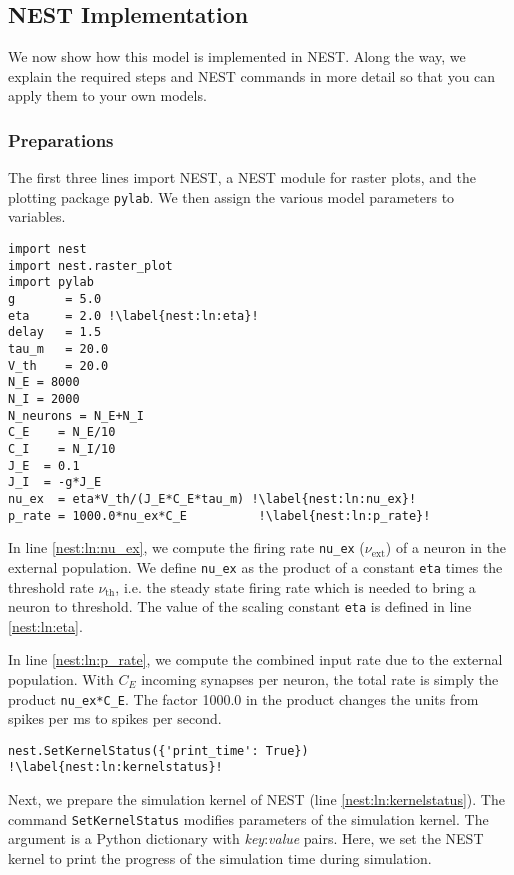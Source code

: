 \documentclass{article}
\begin{document}
\subsection{NEST Implementation}\label{nest:sec:brunel_impl}

We now show how this model is implemented in NEST. Along the way, we
explain the required steps and NEST commands in more detail so that
you can apply them to your own models.

\subsubsection{Preparations}
The first three lines import NEST, a NEST module for raster plots, and
the plotting package \lstinline!pylab!. We then assign the various model
parameters to variables.
\begin{lstlisting}[name=Brunel_interactive]
import nest
import nest.raster_plot
import pylab
g       = 5.0 
eta     = 2.0 !\label{nest:ln:eta}!
delay   = 1.5 
tau_m   = 20.0
V_th    = 20.0
N_E = 8000
N_I = 2000
N_neurons = N_E+N_I
C_E    = N_E/10
C_I    = N_I/10
J_E  = 0.1
J_I  = -g*J_E
nu_ex  = eta*V_th/(J_E*C_E*tau_m) !\label{nest:ln:nu_ex}!
p_rate = 1000.0*nu_ex*C_E          !\label{nest:ln:p_rate}!
\end{lstlisting}
In line \ref{nest:ln:nu_ex}, we compute the firing rate
\lstinline!nu_ex! ($\nu_{\text{ext}}$) of a neuron in the external population. We define
\lstinline!nu_ex! as the product of a constant \lstinline!eta! times
the threshold rate $\nu_{\text{th}}$, i.e. the steady state firing
rate which is needed to bring a neuron to threshold. The value of the
scaling constant  \lstinline!eta! is defined in line \ref{nest:ln:eta}.

In line \ref{nest:ln:p_rate}, we compute the combined input rate due to the
external population. With $C_E$ incoming synapses per neuron, the total rate is
simply the product \lstinline!nu_ex*C_E!. The factor 1000.0 in the
product changes the units from spikes per ms to spikes per second.
 
\begin{lstlisting}[name=Brunel_interactive]
nest.SetKernelStatus({'print_time': True}) !\label{nest:ln:kernelstatus}!
\end{lstlisting}
Next, we prepare the simulation kernel of NEST (line
\ref{nest:ln:kernelstatus}). The command \lstinline!SetKernelStatus!
modifies parameters of the simulation kernel. The argument is a Python
dictionary with \emph{key}:\emph{value} pairs. Here, we set the NEST
kernel to print the progress of the simulation time during simulation.
\end{document}

